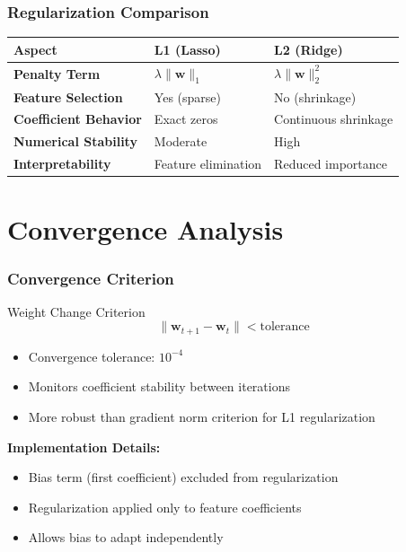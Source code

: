 \documentclass[11pt,aspectratio=169]{beamer}
\begin{document}
\begin{frame}
    \frametitle{Regularization Comparison}
    \begin{table}
        \centering
        \small
        \begin{tabular}{lll}
            \toprule
            \textbf{Aspect} & \textbf{L1 (Lasso)} & \textbf{L2 (Ridge)} \\
            \midrule
            \textbf{Penalty Term} & $\lambda\|\mathbf{w}\|_1$ & $\lambda\|\mathbf{w}\|_2^2$ \\
            \textbf{Feature Selection} & Yes (sparse) & No (shrinkage) \\
            \textbf{Coefficient Behavior} & Exact zeros & Continuous shrinkage \\
            \textbf{Numerical Stability} & Moderate & High \\
            \textbf{Interpretability} & Feature elimination & Reduced importance \\
            \bottomrule
        \end{tabular}
    \end{table}
\end{frame}

\section{Convergence Analysis}

\begin{frame}
    \frametitle{Convergence Criterion}
    \begin{block}{Weight Change Criterion}
        $$\|\mathbf{w}_{t+1} - \mathbf{w}_t\| < \text{tolerance}$$
    \end{block}
    \begin{itemize}
        \item Convergence tolerance: $10^{-4}$
        \item Monitors coefficient stability between iterations
        \item More robust than gradient norm criterion for L1 regularization
    \end{itemize}
    \vspace{0.5cm}
    \textbf{Implementation Details:}
    \begin{itemize}
        \item Bias term (first coefficient) excluded from regularization
        \item Regularization applied only to feature coefficients
        \item Allows bias to adapt independently
    \end{itemize}
\end{frame}
\end{document}
